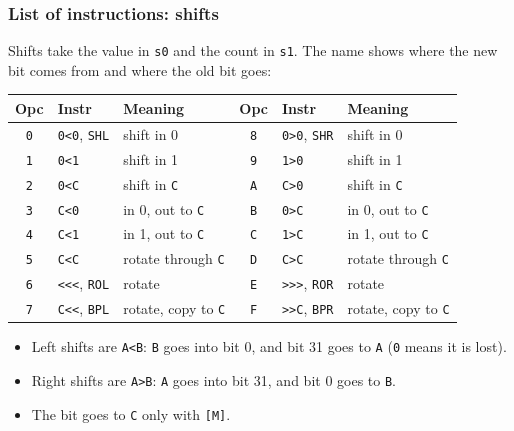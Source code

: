 \documentclass{beamer}
\newcommand{\code}[1]{\texttt{#1}}
\begin{document}
   \begin{frame}
    \frametitle{List of instructions: shifts}
    Shifts take the value in \code{s0} and the count in \code{s1}. The name
    shows where the new bit comes from and where the old bit goes:
    {\small
    \begin{center}
     \begin{tabular}{|c|l|l||c|l|l|}
      \hline
       Opc&Instr&Meaning&Opc&Instr&Meaning\\
      \hline
       \code{0}&\code{0<0}, \code{SHL}&shift in 0         &\code{8}&\code{0>0}, \code{SHR}&shift in 0\\
       \code{1}&\code{0<1}&shift in 1                     &\code{9}&\code{1>0}&shift in 1\\
       \code{2}&\code{0<C}&shift in \code{C}              &\code{A}&\code{C>0}&shift in \code{C}\\
       \code{3}&\code{C<0}&in 0, out to \code{C}          &\code{B}&\code{0>C}&in 0, out to \code{C}\\
       \code{4}&\code{C<1}&in 1, out to \code{C}          &\code{C}&\code{1>C}&in 1, out to \code{C}\\
       \code{5}&\code{C<C}&rotate through \code{C}        &\code{D}&\code{C>C}&rotate through \code{C}\\
       \code{6}&\code{<<<}, \code{ROL}&rotate             &\code{E}&\code{>>>}, \code{ROR}&rotate\\
       \code{7}&\code{C<<}, \code{BPL}&rotate, copy to \code{C}&\code{F}&\code{>>C}, \code{BPR}&rotate, copy to \code{C}\\
      \hline
     \end{tabular}
    \end{center}
    }
    \begin{itemize}
     \item Left shifts are \code{A<B}: \code{B} goes into bit 0, and bit 31
      goes to \code{A} (\code{0} means it is lost).
     \item Right shifts are \code{A>B}: \code{A} goes into bit 31, and
      bit 0 goes to \code{B}.
     \item The bit goes to \code{C} only with \code{[M]}.
    \end{itemize}
   \end{frame}
%
\end{document}
